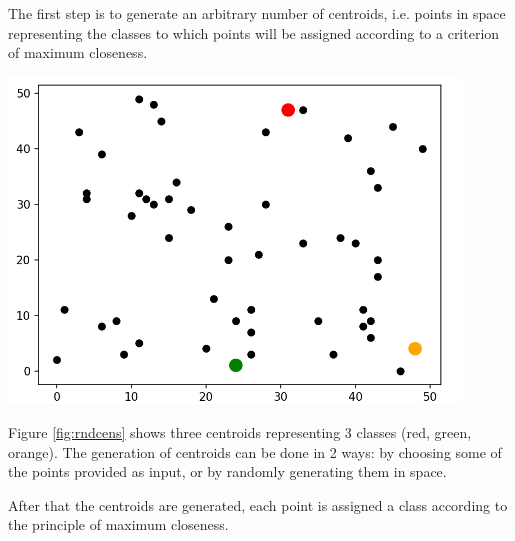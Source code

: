 \documentclass{report}
\begin{document}
\begin{minipage}[b]{0.48\textwidth}
    The first step is to generate an arbitrary number of centroids, i.e. points in space representing the classes to which points will be assigned according to a criterion of maximum closeness.
  
    \begin{center}
        \includegraphics[width = 0.9\textwidth]{imgs/rndcens.png}
        \label{fig:rndcens}
    \end{center}
  
    Figure \ref{fig:rndcens} shows three centroids representing 3 classes (red, green, orange). The generation of centroids can be done in 2 ways: by choosing some of the points provided as input, or by randomly generating them in space.
  
    After that the centroids are generated, each point is assigned a class according to the principle of maximum closeness. 
\end{minipage}
\hspace{0.1in}
\end{document}
